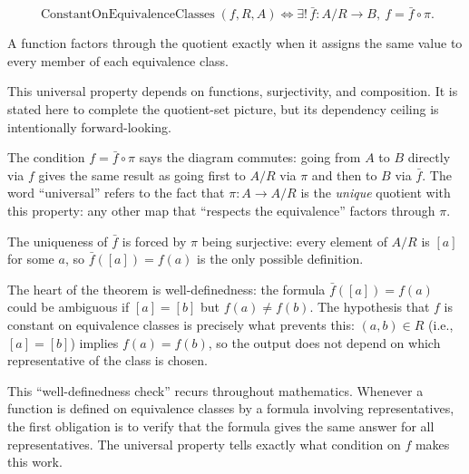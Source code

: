 \begin{remark*}
\[
  \operatorname{ConstantOnEquivalenceClasses}(f,R,A)
  \iff
  \exists!\,\bar f:A/R\to B,\ f=\bar f\circ\pi.
\]
\end{remark*}

\begin{remark*}[Interpretation]
A function factors through the quotient exactly when it assigns the same value
to every member of each equivalence class.
\end{remark*}

\begin{remark*}[Exposition]
This universal property depends on functions, surjectivity, and composition.
It is stated here to complete the quotient-set picture, but its dependency
ceiling is intentionally forward-looking.
\end{remark*}

\begin{remark*}[Exposition]
The condition $f = \bar{f} \circ \pi$ says the diagram commutes: going
from $A$ to $B$ directly via $f$ gives the same result as going first to
$A/R$ via $\pi$ and then to $B$ via $\bar{f}$. The word ``universal''
refers to the fact that $\pi : A \to A/R$ is the \emph{unique} quotient with
this property: any other map that ``respects the equivalence'' factors through
$\pi$.

The uniqueness of $\bar{f}$ is forced by $\pi$ being surjective: every
element of $A/R$ is $[a]$ for some $a$, so $\bar{f}([a]) = f(a)$ is the
only possible definition.
\end{remark*}

\begin{remark*}[Exposition]
The heart of the theorem is well-definedness: the formula $\bar{f}([a]) =
f(a)$ could be ambiguous if $[a] = [b]$ but $f(a) \neq f(b)$. The hypothesis
that $f$ is constant on equivalence classes is precisely what prevents this:
$(a,b) \in R$ (i.e., $[a] = [b]$) implies $f(a) = f(b)$, so the output
does not depend on which representative of the class is chosen.

This ``well-definedness check'' recurs throughout mathematics. Whenever a
function is defined on equivalence classes by a formula involving
representatives, the first obligation is to verify that the formula gives
the same answer for all representatives. The universal property tells exactly
what condition on $f$ makes this work.
\end{remark*}

